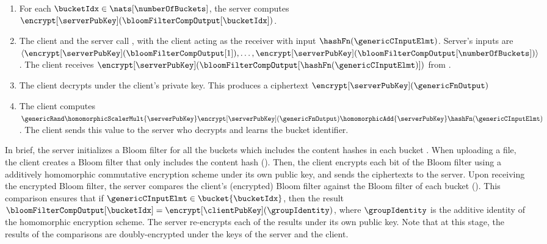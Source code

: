 \begin{mdframed}[frametitle={Protocol implementing \brpmtFunc}, frametitlealignment=\centering, font=\small]
\begin{enumerate}
\item For each $\bucketIdx \in \nats[\numberOfBuckets]$, the server computes $\encrypt[\serverPubKey](\bloomFilterCompOutput[\bucketIdx])$. 

\item \label{ot} The client and the server call \otFunc, with the client acting as the receiver with input $\hashFn(\genericCInputElmt)$. Server's inputs are $\langle \encrypt[\serverPubKey](\bloomFilterCompOutput[1]), \dots, \encrypt[\serverPubKey](\bloomFilterCompOutput[\numberOfBuckets])\rangle$. The client receives $\encrypt[\serverPubKey](\bloomFilterCompOutput[\hashFn(\genericCInputElmt)])$ from \otFunc.

\item The client decrypts under the client's private key. This produces a ciphertext $\encrypt[\serverPubKey](\genericFnOutput)$

\item \label{client:upload} The client computes $\genericRand \homomorphicScalerMult{\serverPubKey}\encrypt[\serverPubKey](\genericFnOutput) \homomorphicAdd{\serverPubKey} \hashFn(\genericCInputElmt)$. The client sends this value to the server who decrypts and learns the bucket identifier.
\end{enumerate}


\end{mdframed}


In brief, the server initializes a Bloom filter for all the buckets which includes the content hashes in each bucket . When uploading a file, the client creates a Bloom filter that only includes the content hash \genericCInputElmt ().
Then, the client encrypts each bit of the Bloom filter using a additively homomorphic commutative
encryption scheme under its own public key, and sends the ciphertexts to the server. Upon receiving the encrypted Bloom filter, the server compares the client's (encrypted) Bloom filter against the Bloom filter of each bucket (). This comparison ensures that if $\genericCInputElmt \in \bucket{\bucketIdx}$, then the result $\bloomFilterCompOutput[\bucketIdx] = \encrypt[\clientPubKey](\groupIdentity)$, where $\groupIdentity$ is the additive identity of the homomorphic encryption scheme. The server re-encrypts each of the results under its own public key. Note that at this stage, the results of the comparisons are doubly-encrypted under the keys of the server and the client. 

